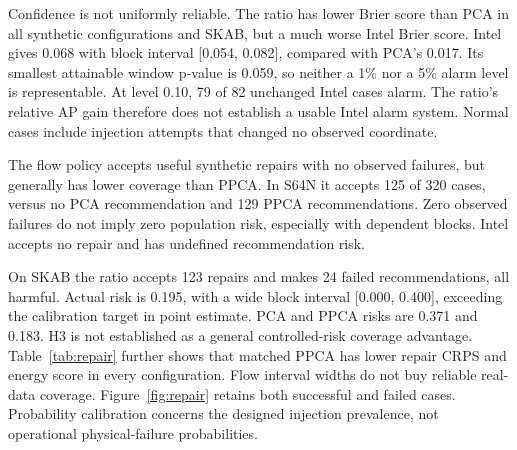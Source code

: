 Confidence is not uniformly reliable. The ratio has lower Brier score than PCA in all synthetic configurations and SKAB, but a much worse Intel Brier score. Intel gives 0.068 with block interval [0.054, 0.082], compared with PCA's 0.017. Its smallest attainable window p-value is 0.059, so neither a 1\% nor a 5\% alarm level is representable. At level 0.10, 79 of 82 unchanged Intel cases alarm. The ratio's relative AP gain therefore does not establish a usable Intel alarm system. Normal cases include injection attempts that changed no observed coordinate.

The flow policy accepts useful synthetic repairs with no observed failures, but generally has lower coverage than PPCA. In S64N it accepts 125 of 320 cases, versus no PCA recommendation and 129 PPCA recommendations. Zero observed failures do not imply zero population risk, especially with dependent blocks. Intel accepts no repair and has undefined recommendation risk.

On SKAB the ratio accepts 123 repairs and makes 24 failed recommendations, all harmful. Actual risk is 0.195, with a wide block interval [0.000, 0.400], exceeding the calibration target in point estimate. PCA and PPCA risks are 0.371 and 0.183. H3 is not established as a general controlled-risk coverage advantage. Table~\ref{tab:repair} further shows that matched PPCA has lower repair CRPS and energy score in every configuration. Flow interval widths do not buy reliable real-data coverage. Figure~\ref{fig:repair} retains both successful and failed cases. Probability calibration concerns the designed injection prevalence, not operational physical-failure probabilities.

